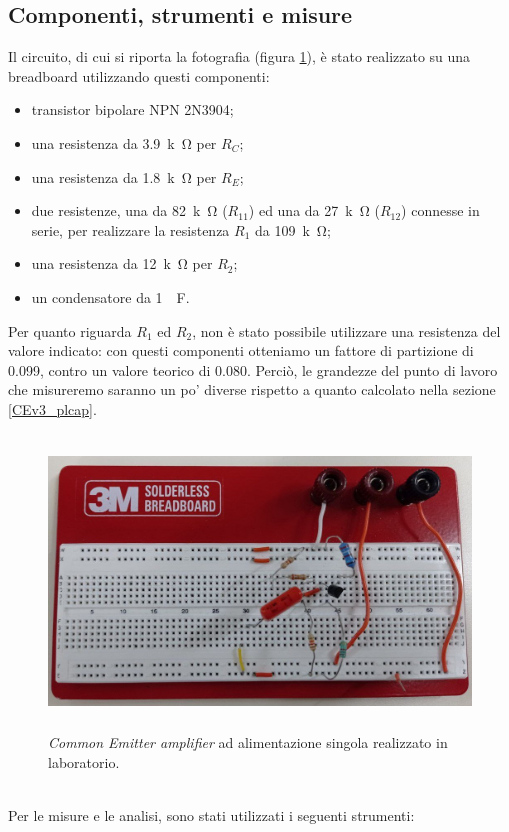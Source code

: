 \documentclass{report}
\begin{document}
\subsection{Componenti, strumenti e misure} \label{CEv3_miscap}
Il circuito, di cui si riporta la fotografia (figura \ref{figura:fotoCEv3}), è stato realizzato su una breadboard utilizzando questi componenti:
\begin{itemize}
\item transistor bipolare NPN 2N3904;
\item una resistenza da \SI{3.9}{k\ohm} per $R_C$;
\item una resistenza da \SI{1.8}{k\ohm} per $R_E$;
\item due resistenze, una da \SI{82}{k\ohm} ($R_{11}$) ed una da \SI{27}{k\ohm} ($R_{12}$) connesse in serie, per realizzare la resistenza $R_1$ da \SI{109}{k\ohm};
\item una resistenza da \SI{12}{k\ohm} per $R_2$;
\item un condensatore da \SI{1}{\mu\farad}.
\end{itemize}
Per quanto riguarda $R_1$ ed $R_2$, non è stato possibile utilizzare una resistenza del valore indicato: con questi componenti otteniamo un fattore di partizione di 0.099, contro un valore teorico di 0.080. Perciò, le grandezze del punto di lavoro che misureremo saranno un po' diverse rispetto a quanto calcolato nella sezione \ref{CEv3_plcap}.
\begin{figure}[h]
\centering
\includegraphics[height=7.8cm]{immagini/fotoCEv3}
\caption{\textit{Common Emitter amplifier} ad alimentazione singola realizzato in laboratorio.}
\label{figura:fotoCEv3}
\end{figure}
\\Per le misure e le analisi, sono stati utilizzati i seguenti strumenti:
\end{document}
